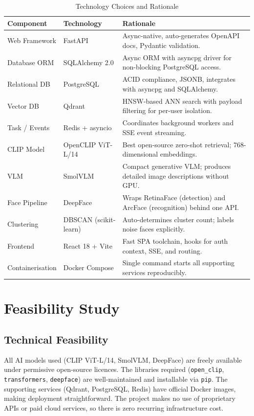 \documentclass[12pt,a4paper,oneside]{report}
\begin{document}
\begin{table}[H]
\centering\small
\caption{Technology Choices and Rationale}
\label{tab:tech-rationale}
\renewcommand{\arraystretch}{1.4}
\begin{tabular}{|p{2.8cm}|p{3.2cm}|p{7.2cm}|}
\hline
\textbf{Component} & \textbf{Technology} & \textbf{Rationale} \\
\hline
Web Framework & FastAPI & Async-native, auto-generates OpenAPI docs, Pydantic validation. \\
\hline
Database ORM & SQLAlchemy 2.0 & Async ORM with asyncpg driver for non-blocking PostgreSQL access. \\
\hline
Relational DB & PostgreSQL & ACID compliance, JSONB, integrates with asyncpg and SQLAlchemy. \\
\hline
Vector DB & Qdrant & HNSW-based ANN search with payload filtering for per-user isolation. \\
\hline
Task / Events & Redis + asyncio & Coordinates background workers and SSE event streaming. \\
\hline
CLIP Model & OpenCLIP ViT-L/14 & Best open-source zero-shot retrieval; 768-dimensional embeddings. \\
\hline
VLM & SmolVLM & Compact generative VLM; produces detailed image descriptions without GPU. \\
\hline
Face Pipeline & DeepFace & Wraps RetinaFace (detection) and ArcFace (recognition) behind one API. \\
\hline
Clustering & DBSCAN (scikit-learn) & Auto-determines cluster count; labels noise faces explicitly. \\
\hline
Frontend & React 18 + Vite & Fast SPA toolchain, hooks for auth context, SSE, and routing. \\
\hline
Containerisation & Docker Compose & Single command starts all supporting services reproducibly. \\
\hline
\end{tabular}
\end{table}

\section{Feasibility Study}

\subsection{Technical Feasibility}
All AI models used (CLIP ViT-L/14, SmolVLM, DeepFace) are freely
available under permissive open-source licences.  The libraries required
(\texttt{open\_clip}, \texttt{transformers}, \texttt{deepface}) are
well-maintained and installable via \texttt{pip}.  The supporting services
(Qdrant, PostgreSQL, Redis) have official Docker images, making
deployment straightforward.  The project makes no use of proprietary APIs
or paid cloud services, so there is zero recurring infrastructure cost.
\end{document}

